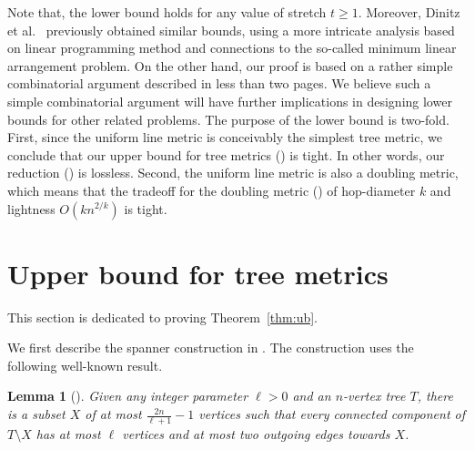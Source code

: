 \documentclass[11pt,english]{article}
\newtheorem{lemma}[theorem]{Lemma}
\begin{document}
Note that, the lower bound holds for any value of stretch $t \ge 1$. Moreover, Dinitz et al.~\cite{dinitz2010low} previously obtained similar bounds, using a more intricate analysis based on linear programming method and connections to the so-called minimum linear arrangement problem. On the other hand, our proof is based on a rather simple combinatorial argument described in less than two pages. We believe such a simple combinatorial argument will have further implications in designing lower bounds for other related problems. 
The purpose of the lower bound is two-fold. First, since the uniform line metric is conceivably the simplest tree metric, we conclude that our upper bound for tree metrics () is tight. In other words, our reduction () is lossless. Second, the uniform line metric is also a doubling metric, which means that the tradeoff for the doubling metric () of hop-diameter $k$ and lightness $O(kn^{2/k})$ is tight.











     \section{Upper bound for tree metrics}\label{sec:ub}
This section is dedicated to proving Theorem~\ref{thm:ub}. 
\ub*


We first describe the spanner construction in . The construction uses the following well-known result.
\begin{lemma}[\cite{FL22}]\label{lem:split}
Given any integer parameter $\ell > 0$ and an $n$-vertex tree $T$, there is a subset $X$ of at most $\frac{2n}{\ell + 1}-1$ vertices such that every connected component of $T \setminus X$ has at most $\ell$  vertices and at most two outgoing edges towards $X$.
\end{lemma}
\end{document}
